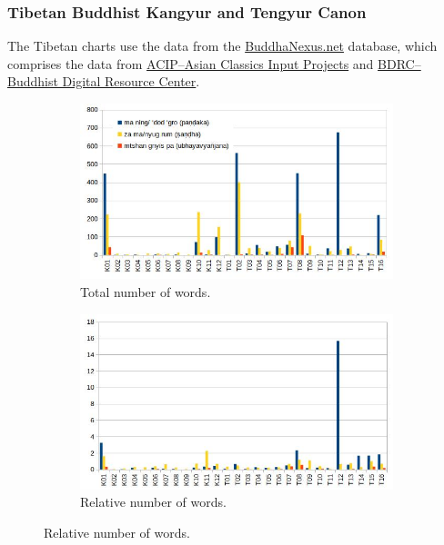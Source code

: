 \subsubsection*{Tibetan Buddhist Kangyur and Tengyur Canon}

The Tibetan charts use the data from the \href{https://buddhanexus.net}{BuddhaNexus.net} database, which comprises the data from \href{https://asianclassics.org/}{ACIP--Asian Classics Input Projects} and \href{https://www.tbrc.org/}{BDRC--Buddhist Digital Resource Center}.

\begin{figure}[!h]
  \begin{subfigure}{0.5\linewidth}
    \includegraphics[width=\linewidth]{tibetan.jpg}
    \caption{Total number of words.}
  \end{subfigure}
  \hfill
  \begin{subfigure}{0.5\linewidth}
    \includegraphics[width=\linewidth]{tibetan_weighted.jpg}
    \caption{Relative number of words.}
  \end{subfigure}
\setcounter{figure}{8}
\label{tibetan1}
\end{figure}


